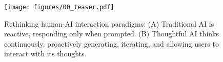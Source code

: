 \begin{figure}
    \centering
  \texttt{[image: figures/00\_teaser.pdf]}
    \caption{Rethinking human-AI interaction paradigms:
(A) Traditional AI is reactive, responding only when prompted.
(B) Thoughtful AI thinks continuously, proactively generating, iterating, and allowing users to interact with its thoughts.
}
    \label{fig:teaser}
\end{figure}
